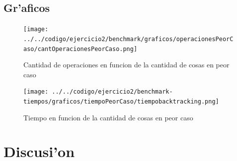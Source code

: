 \subsection{Gr'aficos}

\begin{figure}[H]
\centering
\texttt{[image: ../../codigo/ejercicio2/benchmark/graficos/operacionesPeorCaso/cantOperacionesPeorCaso.png]}
\caption{Cantidad de operaciones en funcion de la cantidad de cosas en peor caso}
\end{figure}

\begin{figure}[H]
\centering
\texttt{[image: ../../codigo/ejercicio2/benchmark-tiempos/graficos/tiempoPeorCaso/tiempobacktracking.png]}
\caption{Tiempo en funcion de la cantidad de cosas en peor caso}
\end{figure}

\section{Discusi'on}


	